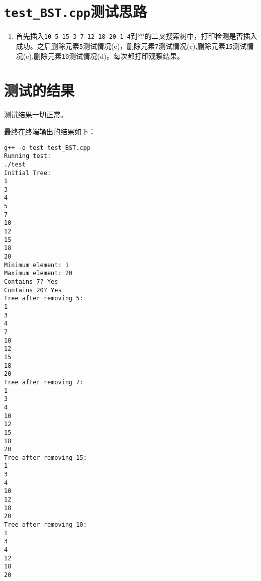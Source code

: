 \documentclass[UTF8]{ctexart}
\begin{document}
\section{\texttt{test\_BST.cpp}测试思路}
\begin{enumerate}
	\item 
	首先插入\texttt{10 5 15 3 7 12 18 20 1 4}到空的二叉搜索树中，打印检测是否插入成功。之后删除元素\texttt{5}测试情况(e)，删除元素\texttt{7}测试情况(c),删除元素\texttt{15}测试情况(e),删除元素\texttt{10}测试情况(d)。每次都打印观察结果。
\end{enumerate}

\section{测试的结果}

测试结果一切正常。

最终在终端输出的结果如下：
\begin{lstlisting}
g++ -o test test_BST.cpp
Running test:
./test
Initial Tree:
1
3
4
5
7
10
12
15
18
20
Minimum element: 1
Maximum element: 20
Contains 7? Yes
Contains 20? Yes
Tree after removing 5:
1
3
4
7
10
12
15
18
20
Tree after removing 7:
1
3
4
10
12
15
18
20
Tree after removing 15:
1
3
4
10
12
18
20
Tree after removing 10:
1
3
4
12
18
20
\end{lstlisting}
\end{document}
